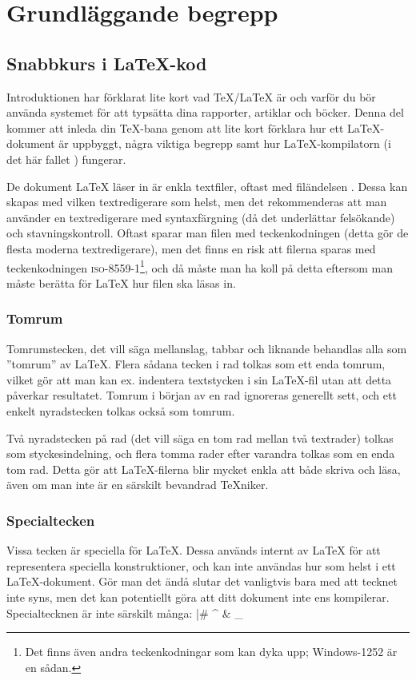 \documentclass[10pt,../../a4.tex]{subfiles}
\begin{document}
\chapter{Grundläggande begrepp}\label{sec:1}
\section{Snabbkurs i \LaTeX-kod}
Introduktionen har förklarat lite kort vad \TeX/\LaTeX{} är och varför du
bör använda systemet för att typsätta dina rapporter, artiklar och böcker.
Denna del kommer att inleda din \TeX-bana genom att lite kort förklara hur
ett \LaTeX-dokument är uppbyggt, några viktiga begrepp samt hur
\LaTeX-kompilatorn (i det här fallet ) fungerar.

De dokument \LaTeX{} läser in är enkla textfiler, oftast med filändelsen
. Dessa kan skapas med vilken textredigerare som helst,
men det rekommenderas att man använder
en textredigerare med syntaxfärgning (då det underlättar felsökande) och
stavningskontroll. Oftast sparar man filen med teckenkodningen \UTF{} 
(detta gör de flesta moderna textredigerare), men det finns en risk att
filerna sparas med teckenkodningen \textsc{iso-8559-1}\footnote{Det finns 
även andra teckenkodningar som kan dyka upp{;} Windows-1252 är en sådan.}, 
och då måste man ha koll på detta eftersom man måste berätta för \LaTeX{}
hur filen ska läsas in.

\subsection{Tomrum}
Tomrumstecken, det vill säga mellanslag, tabbar och liknande behandlas
alla som ”tomrum” av \LaTeX{}. Flera sådana tecken i rad tolkas som ett
enda tomrum, vilket gör att man kan ex. indentera textstycken i sin
\LaTeX-fil utan att detta påverkar resultatet. Tomrum i början av en rad
ignoreras generellt sett, och ett enkelt nyradstecken tolkas också som
tomrum.

Två nyradstecken på rad (det vill säga en tom rad mellan två textrader) tolkas som
styckesindelning, och flera tomma rader efter varandra tolkas som en enda
tom rad. Detta gör att \LaTeX{}-filerna blir mycket enkla att både skriva
och läsa, även om man inte är en särskilt bevandrad \TeX{}niker.

\subsection{Specialtecken}
Vissa tecken är speciella för \LaTeX{}. Dessa används internt av \LaTeX{} 
för att representera speciella konstruktioner, och kan inte användas hur som helst i ett \LaTeX-dokument. Gör man det ändå
slutar det vanligtvis bara med att tecknet inte syns, men det kan
potentiellt göra att ditt dokument inte ens kompilerar. Specialtecknen
är inte särskilt många:
\latex|# ^ & _ { } ~ \ %
\end{document}
